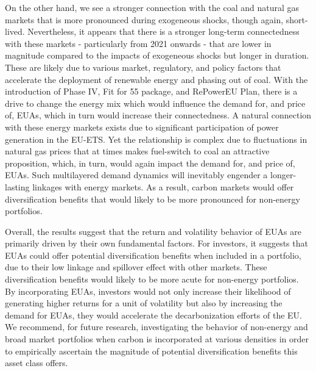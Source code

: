 \documentclass[preprint, 3p,
authoryear]{elsarticle} %
\begin{document}
On the other hand, we see a stronger connection with the coal and
natural gas markets that is more pronounced during exogeneous shocks,
though again, short-lived. Nevertheless, it appears that there is a
stronger long-term connectedness with these markets - particularly from
2021 onwards - that are lower in magnitude compared to the impacts of
exogeneous shocks but longer in duration. These are likely due to
various market, regulatory, and policy factors that accelerate the
deployment of renewable energy and phasing out of coal. With the
introduction of Phase IV, Fit for 55 package, and RePowerEU Plan, there
is a drive to change the energy mix which would influence the demand
for, and price of, EUAs, which in turn would increase their
connectedness. A natural connection with these energy markets exists due
to significant participation of power generation in the EU-ETS. Yet the
relationship is complex due to fluctuations in natural gas prices that
at times makes fuel-switch to coal an attractive proposition, which, in
turn, would again impact the demand for, and price of, EUAs. Such
multilayered demand dynamics will inevitably engender a longer-lasting
linkages with energy markets. As a result, carbon markets would offer
diversification benefits that would likely to be more pronounced for
non-energy portfolios.

Overall, the results suggest that the return and volatility behavior of
EUAs are primarily driven by their own fundamental factors. For
investors, it suggests that EUAs could offer potential diversification
benefits when included in a portfolio, due to their low linkage and
spillover effect with other markets. These diversification benefits
would likely to be more acute for non-energy portfolios. By
incorporating EUAs, investors would not only increase their likelihood
of generating higher returns for a unit of volatility but also by
increasing the demand for EUAs, they would accelerate the
decarbonization efforts of the EU. We recommend, for future research,
investigating the behavior of non-energy and broad market portfolios
when carbon is incorporated at various densities in order to empirically
ascertain the magnitude of potential diversification benefits this asset
class offers.

\newpage

\appendix
\end{document}
